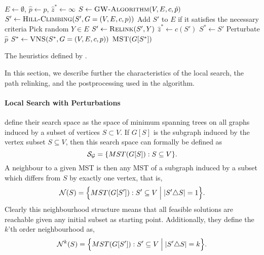  \begin{algorithm}[h!]
   \begin{algorithmic}[1]
     \State $E \gets \emptyset$, $\hat{p} \gets p$, $\hat{z}^* \gets \infty$
     \State $S \gets \Call{GW-Algorithm}{V,E, c, \hat{p}}$ \label{alg:canuto:line:gw}
     \State $S' \gets \Call{Hill-Climbing}{S', G = (V, E, c, p)}$ \label{alg:canuto:line:hc}
     \State Add $S'$ to $E$ if it satisfies the necessary criteria \label{alg:canuto:line:elite}
     \State Pick random $Y \in E$
     \State $S' \gets \Call{Relink}{S', Y}$ \label{alg:canuto:line:relink}
     \State $\hat{z}^* \gets c(S')$
     \State $S^* \gets S'$
     \EndIf
     \EndIf
     \State Perturbate $\hat{p}$
     \EndFor
     \State $S^* \gets \Call{VNS}{S^*, G = (V, E, c, p)}$\label{alg:canuto:line:vns}
     \State \Return $\Call{MST}{G[S^*]}$
     \EndProcedure
 \end{algorithmic}
 \caption{The heuristics defined by \citet{canuto2001local}.}\label{alg:heuristics:canuto}
 \end{algorithm}

 In this section, we
 describe further the characteristics of the local search, the
 path relinking, and the postprocessing used in the algorithm.
\paragraph{Local Search with Perturbations}
\citet{canuto2001local} define their search space as the space of minimum spanning
trees on all graphs induced by a subset of vertices
 $S \subset V$. If $G[S]$ is the subgraph induced by the vertex subset $S \subseteq V$, then
 this search space can formally be defined as
\[\mathcal{S_G} = \{MST(G[S]) : S \subseteq V \}\mathnormal{.}\]
A neighbour to a given MST is then any MST of a subgraph induced by a subset which differs from $S$
 by exactly one vertex, that is,
\[\mathcal{N}(S) = \Big\{MST(G[S']) : S' \subseteq V \Bigm| |S' \triangle S| = 1 \Big\}\mathnormal{.}\] 
Clearly this neighbourhood structure means that all feasible solutions are reachable
given any initial subset as starting point. Additionally, they define the
$k$'th order neighbourhood as,
\[\mathcal{N}^k(S) = \Big\{MST(G[S']) : S' \subseteq V \Bigm| |S' \triangle S| = k \Big\}\mathnormal{.}\] 

